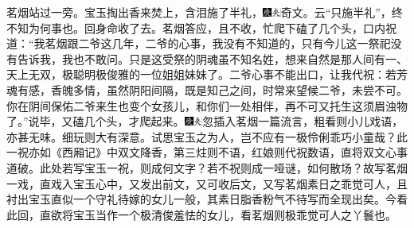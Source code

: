 茗烟站过一旁。宝玉掏出香来焚上，含泪施了半礼，{\includegraphics[width=3mm]{../Images/00004}\includegraphics[width=3mm]{../Images/00012}\footnotesize \kaishu 奇文。云“只施半礼”，终不知为何事也。}回身命收了去。茗烟答应，且不收，忙爬下磕了几个头，口内祝道：“我茗烟跟二爷这几年，二爷的心事，我没有不知道的，只有今儿这一祭祀没有告诉我，我也不敢问。只是这受祭的阴魂虽不知名姓，想来自然是那人间有一、天上无双，极聪明极俊雅的一位姐姐妹妹了。二爷心事不能出口，让我代祝：若芳魂有感，香魄多情，虽然阴阳间隔，既是知己之间，时常来望候二爷，未尝不可。你在阴间保佑二爷来生也变个女孩儿，和你们一处相伴，再不可又托生这须眉浊物了。”说毕，又磕几个头，才爬起来。{\includegraphics[width=3mm]{../Images/00004}\includegraphics[width=3mm]{../Images/00012}\footnotesize \kaishu 忽插入茗烟一篇流言，粗看则小儿戏语，亦甚无味。细玩则大有深意。试思宝玉之为人，岂不应有一极伶俐乖巧小童哉？此一祝亦如《西厢记》中双文降香，第三炷则不语，红娘则代祝数语，直将双文心事道破。此处若写宝玉一祝，则成何文字？若不祝则成一哑谜，如何散场？故写茗烟一戏，直戏入宝玉心中，又发出前文，又可收后文，又写茗烟素日之乖觉可人，且衬出宝玉直似一个守礼待嫁的女儿一般，其素日脂香粉气不待写而全现出矣。今看此回，直欲将宝玉当作一个极清俊羞怯的女儿，看茗烟则极乖觉可人之丫鬟也。}

